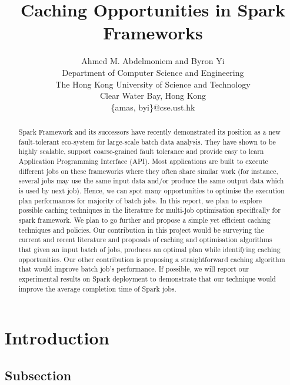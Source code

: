 \documentclass[11pt]{article}
\title{Caching Opportunities in Spark Frameworks}
\author{Ahmed M. Abdelmoniem and Byron Yi\\
Department of Computer Science and Engineering\\
The Hong Kong University of Science and Technology\\
Clear Water Bay, Hong Kong\\
\{amas, byi\}@cse.ust.hk
}
\date{}
\begin{document}
\maketitle

\begin{abstract}
  Spark Framework and its successors have recently demonstrated its position as a new fault-tolerant eco-system for large-scale batch data analysis. They have shown to be highly scalable, support coarse-grained fault tolerance and provide easy to learn Application Programming Interface (API).  Most applications are built to execute different jobs on these frameworks where they often share similar work (for instance, several jobs may use the same input data and/or produce the same output data which is used by next job). Hence, we can spot many opportunities to optimise the execution plan performances  for majority of batch jobs. In this report, we plan to explore possible caching techniques in the literature for multi-job optimisation specifically for spark framework.  We plan to go further and propose a simple yet efficient caching techniques and policies. Our contribution in this project would be surveying the current and recent literature and proposals of caching and optimisation algorithms that given an input batch of jobs, produces an optimal plan while identifying caching opportunities. Our other contribution is proposing a straightforward caching algorithm that would improve batch job's performance. If possible, we will report our experimental results on Spark deployment to demonstrate that our technique would improve the average completion time of Spark jobs.
\end{abstract}

\section{Introduction}
\subsection{Subsection}
\end{document}
